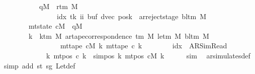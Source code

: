 \begin{isabellebody}
\ \ \ \ \ \ \ \ \ \ {\isasymor}\ {\isacharparenleft}{\kern0pt}qM{\isacharprime}{\kern0pt}\ {\isacharequal}{\kern0pt}\ r{\isacharunderscore}{\kern0pt}tm\ M\isanewline
\ \ \ \ \ \ \ \ \ \ \ \ \ \ \ {\isasymand}\ {\isacharparenleft}{\kern0pt}idx{\isacharcomma}{\kern0pt}\ tk{\isacharcomma}{\kern0pt}\ ii{\isacharcomma}{\kern0pt}\ buf{}{\isacharcomma}{\kern0pt}\ dvec{\isacharcomma}{\kern0pt}\ posk{}{\isacharparenright}{\kern0pt}\ {\isacharequal}{\kern0pt}\ ar{\isacharunderscore}{\kern0pt}reject{\isacharunderscore}{\kern0pt}stage\ {\isacharparenleft}{\kern0pt}bl{\isacharunderscore}{\kern0pt}tm\ M{\isacharparenright}{\kern0pt}{\isacharparenright}{\kern0pt}{\isacharparenright}{\kern0pt}\isanewline
\ \ \ \ \ \ \ {\isasymand}\ mt{\isacharunderscore}{\kern0pt}state\ cM\ {\isacharequal}{\kern0pt}\ qM{\isacharprime}{\kern0pt}\isanewline
\ \ \ \ \ \ \ {\isasymand}\ {\isacharparenleft}{\kern0pt}{\isasymforall}k\ {\isacharless}{\kern0pt}\ k{\isacharunderscore}{\kern0pt}tm\ M{\isachardot}{\kern0pt}\ ar{\isacharunderscore}{\kern0pt}tape{\isacharunderscore}{\kern0pt}correspondence\ {\isacharparenleft}{\kern0pt}{\isasymGamma}{\isacharunderscore}{\kern0pt}tm\ M{\isacharparenright}{\kern0pt}\ {\isacharparenleft}{\kern0pt}le{\isacharunderscore}{\kern0pt}tm\ M{\isacharparenright}{\kern0pt}\ {\isacharparenleft}{\kern0pt}bl{\isacharunderscore}{\kern0pt}tm\ M{\isacharparenright}{\kern0pt}\isanewline
\ \ \ \ \ \ \ \ \ \ \ \ \ \ \ \ \ {\isacharparenleft}{\kern0pt}mt{\isacharunderscore}{\kern0pt}tape\ cM\ k{\isacharparenright}{\kern0pt}\ {\isacharparenleft}{\kern0pt}mt{\isacharunderscore}{\kern0pt}tape\ c{\isacharprime}{\kern0pt}\ k{\isacharparenright}{\kern0pt}{\isacharparenright}{\kern0pt}\isanewline
\ \ \ \ \ \ \ {\isasymand}\ {\isacharparenleft}{\kern0pt}idx\ {\isacharequal}{\kern0pt}\ AR{\isacharunderscore}{\kern0pt}SimRead\isanewline
\ \ \ \ \ \ \ \ \ \ \ \ {\isasymlongrightarrow}\ {\isacharparenleft}{\kern0pt}{\isasymforall}k{\isachardot}{\kern0pt}\ mt{\isacharunderscore}{\kern0pt}pos\ c{\isacharprime}{\kern0pt}\ k\ {\isacharequal}{\kern0pt}\ sim{\isacharunderscore}{\kern0pt}pos\ {\isacharquery}{\kern0pt}k\ {\isacharparenleft}{\kern0pt}mt{\isacharunderscore}{\kern0pt}pos\ cM\ k{\isacharparenright}{\kern0pt}{\isacharparenright}{\kern0pt}{\isacharparenright}{\kern0pt}{\isachardoublequoteclose}\isanewline
\ \ \ \ \isamarkupfalse%
\ sim\ \isamarkupfalse%
\ ar{\isacharunderscore}{\kern0pt}simulates{\isacharunderscore}{\kern0pt}def\ \isamarkupfalse%
\ {\isacharparenleft}{\kern0pt}simp\ add{\isacharcolon}{\kern0pt}\ st\ sg\ Let{\isacharunderscore}{\kern0pt}def{\isacharparenright}{\kern0pt}\isanewline

\end{isabellebody}
